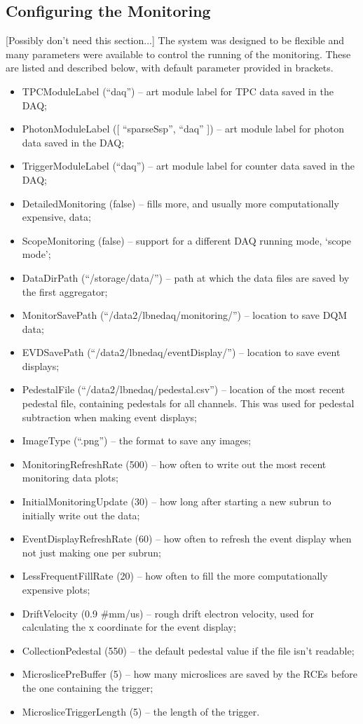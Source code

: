 \subsection{Configuring the Monitoring}\label{sec:MonitoringConfiguration}

[Possibly don't need this section...]
The system was designed to be flexible and many parameters were available to control the running of the monitoring.  These are listed and described below, with default parameter provided in brackets.

\begin{itemize}
\item TPCModuleLabel (``daq'') -- art module label for TPC data saved in the DAQ;
\item PhotonModuleLabel ([ ``sparseSsp'', ``daq'' ]) -- art module label for photon data saved in the DAQ;
\item TriggerModuleLabel (``daq'') -- art module label for counter data saved in the DAQ;
\item DetailedMonitoring (false) -- fills more, and usually more computationally expensive, data;
\item ScopeMonitoring (false) -- support for a different DAQ running mode, `scope mode';
\item DataDirPath (``/storage/data/'') -- path at which the data files are saved by the first aggregator;
\item MonitorSavePath (``/data2/lbnedaq/monitoring/'') -- location to save DQM data;
\item EVDSavePath (``/data2/lbnedaq/eventDisplay/'') -- location to save event displays;
\item PedestalFile (``/data2/lbnedaq/pedestal.csv'') -- location of the most recent pedestal file, containing pedestals for all channels.  This was used for pedestal subtraction when making event displays;
\item ImageType (``.png'') -- the format to save any images;
\item MonitoringRefreshRate (500) -- how often to write out the most recent monitoring data plots;
\item InitialMonitoringUpdate (30) -- how long after starting a new subrun to initially write out the data;
\item EventDisplayRefreshRate (60) -- how often to refresh the event display when not just making one per subrun;
\item LessFrequentFillRate (20) -- how often to fill the more computationally expensive plots;
\item DriftVelocity (0.9 \#mm/us) -- rough drift electron velocity, used for calculating the x coordinate for the event display;
\item CollectionPedestal (550) -- the default pedestal value if the file isn't readable;
\item MicroslicePreBuffer (5) -- how many microslices are saved by the RCEs before the one containing the trigger;
\item MicrosliceTriggerLength (5) -- the length of the trigger.
\end{itemize}

